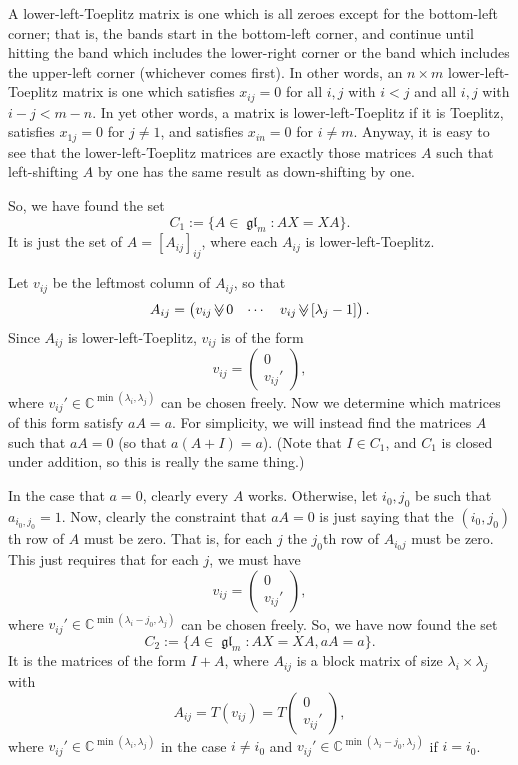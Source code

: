 \documentclass[12pt,psamsfonts]{article}
\newcommand{\downshift}{\mathbin{\rotatebox[origin=c]{90}{$\ll$}}}
\DeclareMathOperator{\gl}{\mathfrak{gl}}
\begin{document}
A lower-left-Toeplitz matrix is one which is all zeroes except for the bottom-left corner; that is, the bands start in the bottom-left corner, and continue until hitting the band which includes the lower-right corner or the band which includes the upper-left corner (whichever comes first).
In other words, an \(n \times m\) lower-left-Toeplitz matrix is one which satisfies \(x_{ij} = 0\) for all \(i,j\) with \(i < j\) and all \(i,j\) with \(i - j < m - n\).
In yet other words, a matrix is lower-left-Toeplitz if it is Toeplitz, satisfies \(x_{1j} = 0\) for \(j \neq 1\), and satisfies \(x_{in} = 0\) for \(i \neq m\).
Anyway, it is easy to see that the lower-left-Toeplitz matrices are exactly those matrices \(A\) such that left-shifting \(A\) by one has the same result as down-shifting by one.
\par So, we have found the set 
\[C_1 := \{A \in \gl_m : AX = XA\}.\]
It is just the set of \(A = [A_{ij}]_{ij}\), where each \(A_{ij}\) is lower-left-Toeplitz.
\par Let \(v_{ij}\) be the leftmost column of \(A_{ij}\), so that
\[A_{ij} = \begin{pmatrix}
    v_{ij} \downshift 0 & \cdots & v_{ij} \downshift [\lambda_j - 1]
\end{pmatrix}.\]
Since \(A_{ij}\) is lower-left-Toeplitz, \(v_{ij}\) is of the form 
\[v_{ij} = \begin{pmatrix}
    0\\
    v_{ij}'
\end{pmatrix},\]
where \(v_{ij}' \in \mathbb{C}^{\min(\lambda_i, \lambda_j)}\) can be chosen freely.
Now we determine which matrices of this form satisfy \(aA = a\).
For simplicity, we will instead find the matrices \(A\) such that \(aA = 0\) (so that \(a(A + I) = a\)).
(Note that \(I \in C_1\), and \(C_1\) is closed under addition, so this is really the same thing.)
\par In the case that \(a = 0\), clearly every \(A\) works.
Otherwise, let \(i_0, j_0\) be such that \(a_{i_0,j_0} = 1\).
Now, clearly the constraint that \(aA = 0\) is just saying that the \((i_0,j_0)\)th row of \(A\) must be zero.
That is, for each \(j\) the \(j_0\)th row of \(A_{i_0j}\) must be zero.
This just requires that for each \(j\), we must have 
\[v_{ij} = \begin{pmatrix}
    0\\
    v_{ij}'
\end{pmatrix},\]
where \(v_{ij}' \in \mathbb{C}^{\min(\lambda_i - j_0, \lambda_j)}\) can be chosen freely.
So, we have now found the set 
\[C_2 := \{A \in \gl_m : AX = XA, aA = a\}.\]
It is the matrices of the form \(I + A\), where \(A_{ij}\) is a block matrix of size \(\lambda_i \times \lambda_j\) with 
\[A_{ij} = T(v_{ij}) = T\begin{pmatrix}
    0\\
    v_{ij}'
\end{pmatrix},\]
where \(v_{ij}' \in \mathbb{C}^{\min(\lambda_i, \lambda_j)}\) in the case \(i \neq i_0\) and \(v_{ij}' \in \mathbb{C}^{\min(\lambda_i - j_0, \lambda_j)}\) if \(i = i_0\).
\end{document}
